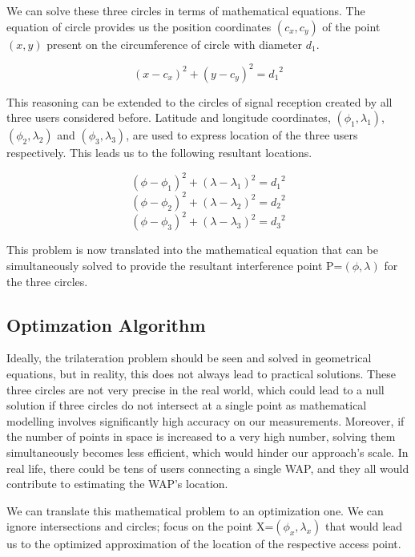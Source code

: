 \documentclass[a4paper,singleside,12pt]{report} %
\begin{document}
				We can solve these three circles in terms of mathematical equations. 
				The equation of circle provides us the position coordinates $\left(c_x, c_y\right)$  of the point $\left(x,y\right)$  present on the circumference of circle with diameter $d_1$.
				
				
				\[{\left(x - c_x\right)}^2 + {\left(y- c_y\right)}^2={d_1}^2\]
				
				
				This reasoning can be extended to the circles of signal reception created by all three users considered before. 
				Latitude and longitude coordinates, $\left(\phi_1, \lambda_1 \right)$, $\left(\phi_2, \lambda_2 \right)$ and $\left(\phi_3, \lambda_3 \right)$,  are used to express location of the three users respectively. 
				This leads us to the following resultant locations. 
				
				\[{\left(\phi - \phi_1\right)}^2 + {\left(\lambda- \lambda_1\right)}^2={d_1}^2\]
				\[{\left(\phi - \phi_2\right)}^2 + {\left(\lambda- \lambda_2\right)}^2={d_2}^2\]
				\[{\left(\phi - \phi_3\right)}^2 + {\left(\lambda- \lambda_3\right)}^2={d_3}^2\]
				
				This problem is now translated into the mathematical equation that can be simultaneously solved to provide the resultant interference point P=$\left(\phi, \lambda\right)$ for the three circles. 
			
			\subsection{Optimzation Algorithm}

				Ideally, the trilateration problem should be seen and solved in geometrical equations, but in reality, this does not always lead to practical solutions. 
				These three circles are not very precise in the real world, which could lead to a null solution if three circles do not intersect at a single point as mathematical modelling involves significantly high accuracy on our measurements. 
				Moreover, if the number of points in space is increased to a very high number, solving them simultaneously becomes less efficient, which would hinder our approach's scale. 
				In real life, there could be tens of users connecting a single WAP, and they all would contribute to estimating the WAP's location. 
				
				We can translate this mathematical problem to an optimization one. 
				We can ignore intersections and circles; focus on the point X=$\left(\phi_x, \lambda_x\right)$ that would lead us to the optimized approximation of the location of the respective access point. 
				
\end{document}
